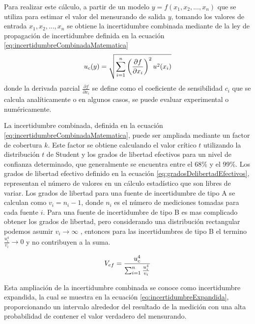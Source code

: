 Para realizar este cálculo, a partir de un modelo $y = f(x_{1},x_{2}, ..., x_{n})$ que se utiliza para estimar el valor del mensurando de salida $y$, tomando los valores de entrada $x_{1},x_{2}, ..., x_{n}$ se obtiene la incertidumbre combinada mediante de la ley de propagación de incertidumbre definida en la ecuación \ref{eq:incertidumbreCombinadaMatematica}
\begin{equation}
    \centering
    u_{c}(y) = \sqrt{\sum_{i=1}^{n} \left( \frac{\partial f}{\partial x_{i}} \right)^2 u^2(x_i)}
    \label{eq:incertidumbreCombinadaMatematica}
\end{equation}
donde la derivada parcial $\frac{\partial f}{\partial x_{i}}$ se define como el coeficiente de sensibilidad $c_{i}$ que se calcula analíticamente o en algunos casos, se puede evaluar experimental o numéricamente.

La incertidumbre combinada, definida en la ecuación \ref{eq:incertidumbreCombinadaMatematica}, puede ser ampliada mediante un factor de cobertura $k$. Este factor se obtiene calculando el valor crítico $t$ utilizando la distribución $t$ de Student y los grados de libertad efectivos para un nivel de confianza determinado, que generalmente se encuentra entre el 68\% y el 99\%. Los grados de libertad efectivo definido en la ecuación \ref{eq:gradosDelibertadEfectivos}, representan el número de valores en un cálculo estadístico que son libres de variar. Los grados de libertad para una fuente de incertidumbre de tipo A se calculan como  $v_{i}= n_{i}-1$, donde $n_{i}$ es el número de mediciones tomadas para cada fuente $i$. Para una fuente de incertidumbre de tipo B es mas complicado obtener los grados de libertad, pero considerando una distribución rectangular podemos asumir $v_{i} \rightarrow \infty$ \cite{Workshop_WMO2021}, entonces para las incertidumbres de tipo B el termino $\frac{u_i^4}{v_i} \rightarrow 0 $ y no contribuyen a la suma.


\begin{equation}
    \centering
    V_{ef} = \frac{u_c^4}{\sum_{i=1}^{n} \frac{u_i^4}{v_i}}
    \label{eq:gradosDelibertadEfectivos}
\end{equation}


Esta ampliación de la incertidumbre combinada se conoce como incertidumbre expandida, la cual se muestra en la ecuación \ref{eq:incertidumbreExpandida}, proporcionando un intervalo alrededor del resultado de la medición con una alta probabilidad de contener el valor verdadero del mensurando.


